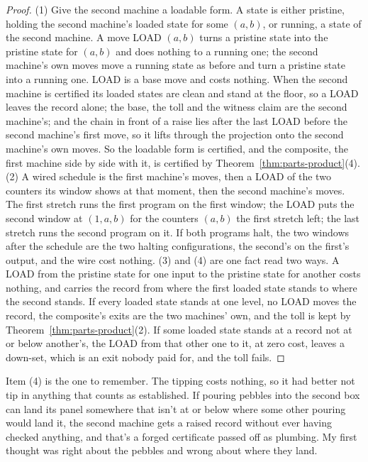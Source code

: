 \documentclass[11pt,twoside]{article}
\theoremstyle{thielethm}
\theoremstyle{thieledef}
\theoremstyle{thieledef}
\theoremstyle{thieledef}
\theoremstyle{thielethm}
\theoremstyle{thieleobs}
\theoremstyle{thielethm}
\begin{document}
\begin{proof}
(1) Give the second machine a loadable form. A state is either pristine, holding the second
machine's loaded state for some $(a, b)$, or running, a state of the second machine. A move LOAD
$(a, b)$ turns a pristine state into the pristine state for $(a, b)$ and does nothing to a running
one; the second machine's own moves move a running state as before and turn a pristine state into
a running one. LOAD is a base move and costs nothing. When the second machine is certified
its loaded states are clean and stand at the floor, so a LOAD leaves the record alone; the base,
the toll and the witness claim are the second machine's; and the chain in front of a raise lies
after the last LOAD before the second machine's first move, so it lifts through the projection
onto the second machine's own moves. So the loadable form is certified, and the composite,
the first machine side by side with it, is certified by Theorem~\ref{thm:parts-product}(4).
(2) A wired schedule is the first machine's moves, then a LOAD of the two counters its window
shows at that moment, then the second machine's moves. The first stretch runs the first program on
the first window; the LOAD puts the second window at $(1, a, b)$ for the counters $(a, b)$ the
first stretch left; the last stretch runs the second program on it. If both programs halt, the two
windows after the schedule are the two halting configurations, the second's on the first's output,
and the wire cost nothing. (3) and (4) are one fact read two ways. A LOAD from the pristine state
for one input to the pristine state for another costs nothing, and carries the record from where the
first loaded state stands to where the second stands. If every loaded state stands at one level,
no LOAD moves the record, the composite's exits are the two machines' own, and the toll is kept by
Theorem~\ref{thm:parts-product}(2). If some loaded state stands at a record not at or below
another's, the LOAD from that other one to it, at zero cost, leaves a down-set, which is an exit nobody
paid for, and the toll fails.
\end{proof}

Item (4) is the one to remember. The tipping costs nothing, so it had better not tip in anything that counts
as established. If pouring pebbles into the second box can land its panel somewhere that isn't at
or below where some other pouring would land it, the second machine gets a raised record without ever having checked anything, and that's a forged certificate passed off as plumbing. My first thought was right about the pebbles and
wrong about where they land.
\end{document}
